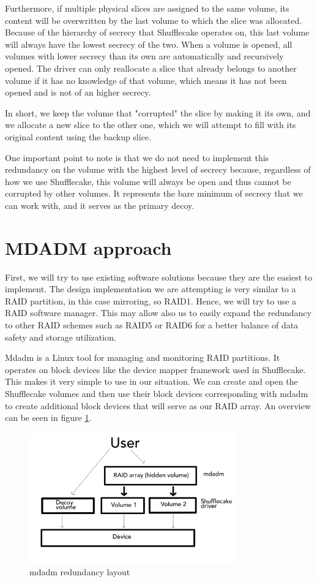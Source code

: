 \documentclass[a4paper,11pt,oneside]{report}
\begin{document}
Furthermore, if multiple physical slices are assigned to the same volume, its content will be overwritten by the last volume to which the slice was allocated. Because of the hierarchy of secrecy that Shufflecake operates on, this last volume will always have the lowest secrecy of the two. When a volume is opened, all volumes with lower secrecy than its own are automatically and recursively opened. The driver can only reallocate a slice that already belongs to another volume if it has no knowledge of that volume, which means it has not been opened and is not of an higher secrecy.

In short, we keep the volume that "corrupted" the slice by making it its own, and we allocate a new slice to the other one, which we will attempt to fill with its original content using the backup slice.

One important point to note is that we do not need to implement this redundancy on the volume with the highest level of secrecy because, regardless of how we use Shufflecake, this volume will always be open and thus cannot be corrupted by other volumes. It represents the bare minimum of secrecy that we can work with, and it serves as the primary decoy. 

\section{MDADM approach}

First, we will try to use existing software solutions because they are the easiest to implement. The design implementation we are attempting is very similar to a RAID partition, in this case mirroring, so RAID1. Hence, we will try to use a RAID software manager. This may allow also us to easily expand the redundancy to other RAID schemes such as RAID5 or RAID6 for a better balance of data safety and storage utilization.

Mdadm is a Linux tool for managing and monitoring RAID partitions\cite{mdadm_man}. It operates on block devices like the device mapper framework used in Shufflecake. This makes it very simple to use in our situation. We can create and open the Shufflecake volumes and then use their block devices corresponding with mdadm to create additional block devices that will serve as our RAID array. An overview can be seen in figure \ref{fig:red_mdadm}.

\begin{figure}[ht]
\centering
\includegraphics[width=0.8\textwidth]{Figures/red_mdadm.png}
\caption{mdadm redundancy layout}
\label{fig:red_mdadm}
\end{figure}
\end{document}
